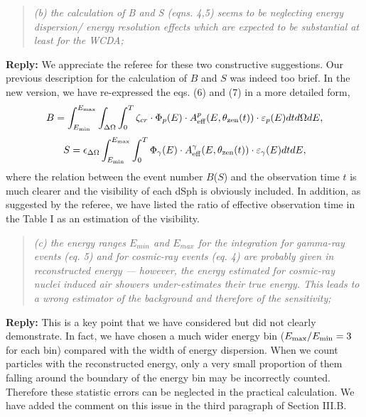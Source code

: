 \documentclass{article}
\begin{document}
\begin{quote}
\emph{(b) the calculation of B and S (eqns. 4,5) seems to be neglecting energy dispersion/ energy resolution effects which are expected to be substantial at least for the WCDA;}
\end{quote}

\textbf{Reply:} We appreciate the referee for these two constructive suggestions. Our previous description for the calculation of $B$ and $S$ was indeed too brief. In the new version, we have re-expressed the eqs. (6) and (7) in a more detailed form,
\begin{equation*}
  B=\int^{E_{\rm max}}_{E_{\rm min}}\int_{\Delta\Omega}\int_0^T\zeta_{cr}\cdot\Phi_{p}(E)\cdot A_{\rm eff}^{p}(E,\theta_{\rm zen}(t))\cdot\varepsilon_{p}(E)dtd\Omega dE,
\end{equation*}
\begin{equation*}
  S=\epsilon_{\Delta\Omega}\int^{E_{\rm max}}_{E_{\rm min}}\int_0^T\Phi_{\gamma}(E)\cdot A_{\rm eff}^{\gamma}(E,\theta_{\rm zen}(t))\cdot\varepsilon_{\gamma}(E)dtdE,
\end{equation*}
where the relation between the event number $B$($S$) and the observation time $t$ is much clearer and the visibility of each dSph is obviously included.
In addition, as suggested by the referee, we have listed the ratio of effective observation time in the Table I as an estimation of the visibility.


\begin{quote}
\emph{(c) the energy ranges $E_{min}$ and $E_{max}$ for the integration for gamma-ray events (eq. 5) and for cosmic-ray events (eq. 4) are probably given in reconstructed energy --- however, the energy estimated for cosmic-ray nuclei induced air showers under-estimates their true energy. This leads to a wrong estimator of the background and therefore of the sensitivity;}
\end{quote}

\textbf{Reply:} This is a key point that we have considered but did not clearly demonstrate. In fact, we have chosen a much wider energy bin ($E_{\rm max}/E_{\rm min}=3$ for each bin) compared with the width of energy dispersion. When we count particles with the reconstructed energy, only a very small proportion of them falling around the boundary of the energy bin may be incorrectly counted. Therefore these statistic errors can be neglected in the practical calculation. We have added the comment on this issue in the third paragraph of Section III.B.
\end{document}
